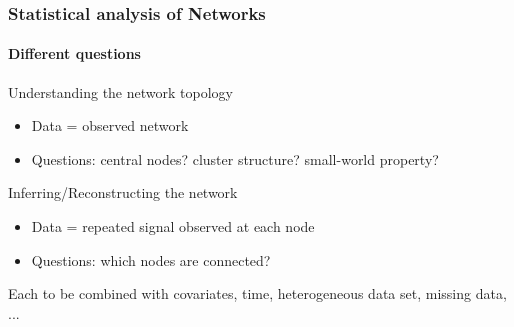 
\begin{frame}
  \frametitle{Statistical analysis of Networks}
  \framesubtitle{Different questions}

  \begin{block}{Understanding the network topology}
    \vspace{-.25cm}
    \begin{itemize}
    \item Data = observed network
    \item Questions: central nodes? cluster structure? small-world property?
    \end{itemize}
  \end{block}
  
  \vfill

  \begin{alertblock}{Inferring/Reconstructing the network}
    \vspace{-.25cm}
    \begin{itemize}
    \item Data = repeated signal observed at each node
    \item Questions: which nodes are connected?
    \end{itemize}
  \end{alertblock}

  \vfill

  \begin{block}{\alert{Each to be combined with}}
    covariates, time, heterogeneous data set, missing data, ...  
  \end{block}
\end{frame}

